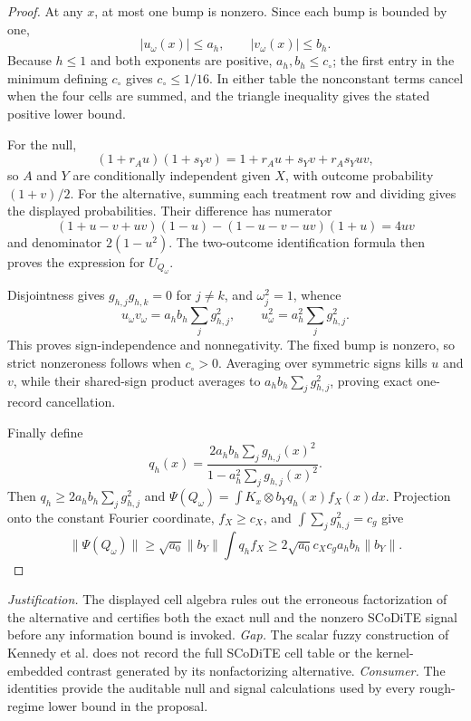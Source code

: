 \documentclass{article}
\begin{document}
\begin{proof}
At any \(x\), at most one bump is nonzero. Since each bump is bounded by one,
\[
|u_\omega(x)|\le a_h,\qquad |v_\omega(x)|\le b_h.
\]
Because \(h\le1\) and both exponents are positive, \(a_h,b_h\le c_\circ\); the first entry in the minimum defining \(c_\circ\) gives \(c_\circ\le1/16\). In either table the nonconstant terms cancel when the four cells are summed, and the triangle inequality gives the stated positive lower bound.

For the null,
\[
(1+r_Au)(1+s_Yv)=1+r_Au+s_Yv+r_As_Yuv,
\]
so \(A\) and \(Y\) are conditionally independent given \(X\), with outcome probability \((1+v)/2\). For the alternative, summing each treatment row and dividing gives the displayed probabilities. Their difference has numerator
\[
(1+u-v+uv)(1-u)-(1-u-v-uv)(1+u)=4uv
\]
and denominator \(2(1-u^2)\). The two-outcome identification formula then proves the expression for \(U_{Q_\omega}\).

Disjointness gives \(g_{h,j}g_{h,k}=0\) for \(j\ne k\), and \(\omega_j^2=1\), whence
\[
u_\omega v_\omega=a_hb_h\sum_jg_{h,j}^2,\qquad
u_\omega^2=a_h^2\sum_jg_{h,j}^2.
\]
This proves sign-independence and nonnegativity. The fixed bump is nonzero, so strict nonzeroness follows when \(c_\circ>0\). Averaging over symmetric signs kills \(u\) and \(v\), while their shared-sign product averages to \(a_hb_h\sum_jg_{h,j}^2\), proving exact one-record cancellation.

Finally define
\[
q_h(x)=\frac{2a_hb_h\sum_jg_{h,j}(x)^2}
 {1-a_h^2\sum_jg_{h,j}(x)^2}.
\]
Then \(q_h\ge2a_hb_h\sum_jg_{h,j}^2\) and
\(\Psi(Q_\omega)=\int K_x\otimes b_Yq_h(x)f_X(x)dx\). Projection onto the constant Fourier coordinate, \(f_X\ge c_X\), and \(\int\sum_jg_{h,j}^2=c_g\) give
\[
\|\Psi(Q_\omega)\|
\ge\sqrt{a_0}\|b_Y\|\int q_hf_X
\ge2\sqrt{a_0}c_Xc_ga_hb_h\|b_Y\|.
\]
\end{proof}
\par\smallskip\noindent \textit{Justification.} The displayed cell algebra rules out the erroneous factorization of the alternative and certifies both the exact null and the nonzero SCoDiTE signal before any information bound is invoked. \textit{Gap.} The scalar fuzzy construction of Kennedy et al. does not record the full SCoDiTE cell table or the kernel-embedded contrast generated by its nonfactorizing alternative. \textit{Consumer.} The identities provide the auditable null and signal calculations used by every rough-regime lower bound in the proposal.
\end{document}
